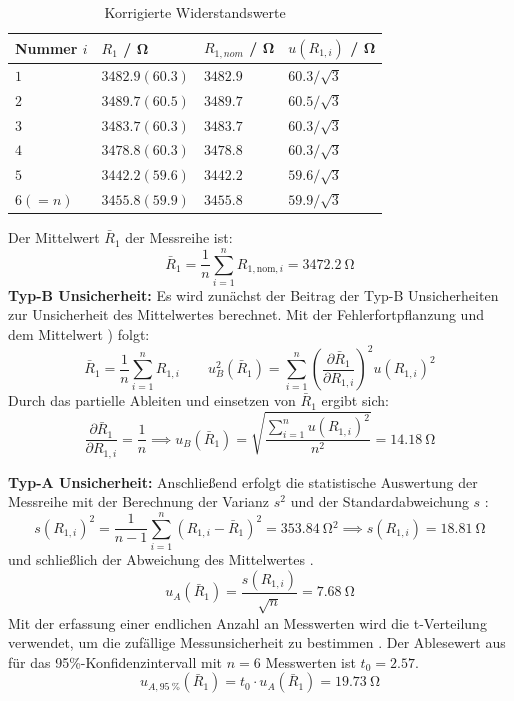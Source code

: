 \begin{table}[h]
	\centering\caption{Korrigierte Widerstandswerte}\label{tab:korrigierte_widerstaende}
	\begin{tabularx}{\textwidth}{YY|YY}
		Nummer $i$ & $R_{1}$ / \si{\ohm} & $R_{1,nom}$ / \si{\ohm} & $u(R_{1,i})$ / \si{\ohm} \\ \midrule
		$1$        & $3482.9(60.3)$      & $3482.9$                & $60.3/\sqrt{3}$          \\
		$2$        & $3489.7(60.5)$      & $3489.7$                & $60.5/\sqrt{3}$          \\
		$3$        & $3483.7(60.3)$      & $3483.7$                & $60.3/\sqrt{3}$          \\
		$4$        & $3478.8(60.3)$      & $3478.8$                & $60.3/\sqrt{3}$          \\
		$5$        & $3442.2(59.6)$      & $3442.2$                & $59.6/\sqrt{3}$          \\
		$6(=n)$    & $3455.8(59.9)$      & $3455.8$                & $59.9/\sqrt{3}$          \\
	\end{tabularx}
\end{table}

Der Mittelwert $\bar{R}_1$ der Messreihe ist:
\[
	\bar{R}_1 = \frac{1}{n} \sum_{i=1}^{n} R_{1,\text{nom},i} = \SI{3472.2}{\ohm}
\]
\textbf{Typ-B Unsicherheit:} Es wird zunächst der Beitrag der Typ-B Unsicherheiten zur Unsicherheit des Mittelwertes berechnet. Mit der Fehlerfortpflanzung \cite[S.~14, Gl.~1.22]{EMTPraktikum2025} und dem Mittelwert \cite[S.~7 Gl.~1.1]{EMTPraktikum2025}) folgt:
\[
	\bar{R}_1 = \frac{1}{n} \sum_{i=1}^{n} R_{1,i} \qquad
	u_B^2(\bar{R}_1) = \sum_{i=1}^{n}\left(\frac{\partial \bar{R}_{1}}{\partial R_{1,i}}\right)^2 u(R_{1,i})^2
\]
Durch das partielle Ableiten und einsetzen von $\bar{R}_1$ ergibt sich:
\[
	\frac{\partial \bar{R}_1}{\partial R_{1,i}} = \frac{1}{n} \implies u_B(\bar{R}_1) = \sqrt{\frac{\sum_{i=1}^{n} u(R_{1,i})^2}{n^2}} = \SI{14.18}{\ohm}
\]

\textbf{Typ-A Unsicherheit:} Anschließend erfolgt die statistische Auswertung der Messreihe mit der Berechnung der Varianz $s^2$ und der Standardabweichung $s$ \cite[S.~7, Gl.~1.3]{EMTPraktikum2025}:
\[
	s(R_{1,i})^2 = \frac{1}{n-1} \sum_{i=1}^{n} (R_{1,i} - \bar{R}_1)^2 = \SI{353.84}{\ohm^2} \implies s(R_{1,i})=\SI{18.81}{\ohm}
\]
und schließlich der Abweichung des Mittelwertes \cite[S.~38, Gl.~1.59]{SchrüferElmar2022EM:M}.
\[
	u_A(\bar{R}_1) = \frac{s(R_{1,i})}{\sqrt{n}} = \SI{7.68}{\ohm}
\]
Mit der erfassung einer endlichen Anzahl an Messwerten wird die t-Verteilung verwendet, um die zufällige Messunsicherheit zu bestimmen \cite[S.~9, Gl.~1.13]{EMTPraktikum2025}. Der Ablesewert aus \cite[S.~10, Tab.~1.1]{EMTPraktikum2025} für das 95\%-Konfidenzintervall mit $n=6$ Messwerten ist $t_0=2.57$.
\[
	u_{A,\SI{95}{\percent}}(\bar{R}_1) = t_0\cdot u_A(\bar{R}_1) = \SI{19.73}{\ohm}
\]

